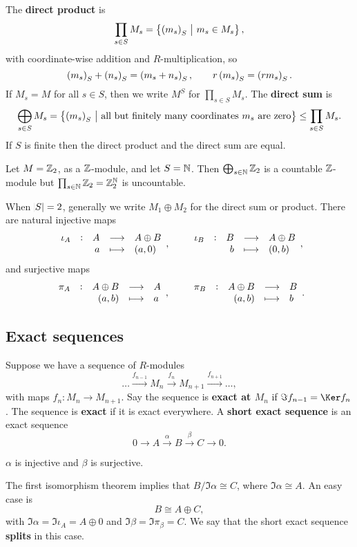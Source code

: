\begin{definition}
The \textbf{direct product} is
$$ \prod_{s \in S} M_s = \cbr{\br{m_s}_S \st m_s \in M_s}, $$
with coordinate-wise addition and $ R $-multiplication, so
$$ \br{m_s}_S + \br{n_s}_S = \br{m_s + n_s}_S, \qquad r\br{m_s}_S = \br{rm_s}_S. $$
If $ M_s = M $ for all $ s \in S $, then we write $ M^S $ for $ \prod_{s \in S} M_s $. The \textbf{direct sum} is
$$ \bigoplus_{s \in S} M_s = \cbr{\br{m_s}_S \st \text{all but finitely many coordinates} \ m_s \ \text{are zero}} \le \prod_{s \in S} M_s. $$
If $ S $ is finite then the direct product and the direct sum are equal.
\end{definition}

\begin{example*}
Let $ M = \mathbb{Z}_2 $, as a $ \mathbb{Z} $-module, and let $ S = \mathbb{N} $. Then $ \bigoplus_{s \in \mathbb{N}} \mathbb{Z}_2 $ is a countable $ \mathbb{Z} $-module but $ \prod_{s \in \mathbb{N}} \mathbb{Z}_2 = \mathbb{Z}_2^{\mathbb{N}} $ is uncountable.
\end{example*}

When $ \abs{S} = 2 $, generally we write $ M_1 \oplus M_2 $ for the direct sum or product. There are natural injective maps
$$ \function[\iota_A]{A}{A \oplus B}{a}{\br{a, 0}}, \qquad \function[\iota_B]{B}{A \oplus B}{b}{\br{0, b}}, $$
and surjective maps
$$ \function[\pi_A]{A \oplus B}{A}{\br{a, b}}{a}, \qquad \function[\pi_B]{A \oplus B}{B}{\br{a, b}}{b}. $$

\subsection{Exact sequences}

\begin{definition}
Suppose we have a sequence of $ R $-modules
$$ \dots \xrightarrow{f_{n - 1}} M_n \xrightarrow{f_n} M_{n + 1} \xrightarrow{f_{n + 1}} \dots, $$
with maps $ f_n : M_n \to M_{n + 1} $. Say the sequence is \textbf{exact at $ M_n $} if $ \Im f_{n - 1} = \Ker f_n $. The sequence is \textbf{exact} if it is exact everywhere. A \textbf{short exact sequence} is an exact sequence
$$ 0 \to A \xrightarrow{\alpha} B \xrightarrow{\beta} C \to 0. $$
\end{definition}

\begin{note*}
$ \alpha $ is injective and $ \beta $ is surjective.
\end{note*}

\pagebreak

The first isomorphism theorem implies that $ B / \Im \alpha \cong C $, where $ \Im \alpha \cong A $. An easy case is
$$ B \cong A \oplus C, $$
with $ \Im \alpha = \Im \iota_A = A \oplus 0 $ and $ \Im \beta = \Im \pi_\beta = C $. We say that the short exact sequence \textbf{splits} in this case.

